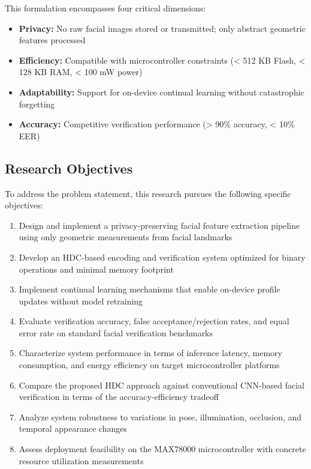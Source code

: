 \documentclass[a4paper,12pt]{article}
\begin{document}
This formulation encompasses four critical dimensions:

\begin{itemize}
    \item \textbf{Privacy:} No raw facial images stored or transmitted; only abstract geometric features processed
    \item \textbf{Efficiency:} Compatible with microcontroller constraints (< 512 KB Flash, < 128 KB RAM, < 100 mW power)
    \item \textbf{Adaptability:} Support for on-device continual learning without catastrophic forgetting
    \item \textbf{Accuracy:} Competitive verification performance (> 90\% accuracy, < 10\% EER)
\end{itemize}

\subsection{Research Objectives}

To address the problem statement, this research pursues the following specific objectives:

\begin{enumerate}
    \item Design and implement a privacy-preserving facial feature extraction pipeline using only geometric measurements from facial landmarks
    
    \item Develop an HDC-based encoding and verification system optimized for binary operations and minimal memory footprint
    
    \item Implement continual learning mechanisms that enable on-device profile updates without model retraining
    
    \item Evaluate verification accuracy, false acceptance/rejection rates, and equal error rate on standard facial verification benchmarks
    
    \item Characterize system performance in terms of inference latency, memory consumption, and energy efficiency on target microcontroller platforms
    
    \item Compare the proposed HDC approach against conventional CNN-based facial verification in terms of the accuracy-efficiency tradeoff
    
    \item Analyze system robustness to variations in pose, illumination, occlusion, and temporal appearance changes
    
    \item Assess deployment feasibility on the MAX78000 microcontroller with concrete resource utilization measurements
\end{enumerate}
\end{document}
